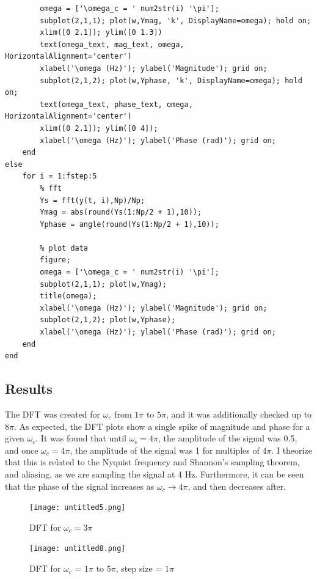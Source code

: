 \documentclass{article}
\begin{document}
\begin{enumerate}
\begin{lstlisting}[style=Matlab-editor]
        % plot data and text
        omega = ['\omega_c = ' num2str(i) '\pi'];
        subplot(2,1,1); plot(w,Ymag, 'k', DisplayName=omega); hold on;
        xlim([0 2.1]); ylim([0 1.3])
        text(omega_text, mag_text, omega, HorizontalAlignment='center')
        xlabel('\omega (Hz)'); ylabel('Magnitude'); grid on;
        subplot(2,1,2); plot(w,Yphase, 'k', DisplayName=omega); hold on;
        text(omega_text, phase_text, omega, HorizontalAlignment='center')
        xlim([0 2.1]); ylim([0 4]);
        xlabel('\omega (Hz)'); ylabel('Phase (rad)'); grid on;
    end
else
    for i = 1:fstep:5
        % fft
        Ys = fft(y(t, i),Np)/Np;
        Ymag = abs(round(Ys(1:Np/2 + 1),10));
        Yphase = angle(round(Ys(1:Np/2 + 1),10));
        
        % plot data
        figure;
        omega = ['\omega_c = ' num2str(i) '\pi'];
        subplot(2,1,1); plot(w,Ymag);
        title(omega);
        xlabel('\omega (Hz)'); ylabel('Magnitude'); grid on;
        subplot(2,1,2); plot(w,Yphase);
        xlabel('\omega (Hz)'); ylabel('Phase (rad)'); grid on;
    end
end
        \end{lstlisting}

\end{enumerate}


\subsection{Results}

The DFT was created for $\omega_c$ from $1\pi$ to $5\pi$, and it was additionally checked up to $8\pi$.  As expected, the DFT plots show a single spike of magnitude and phase for a given $\omega_c$. It was found that until $\omega_c = 4\pi$, the amplitude of the signal was 0.5, and once $\omega_c = 4\pi$, the amplitude of the signal was 1 for multiples of $4\pi$. I theorize that this is related to the Nyquist frequency and Shannon's sampling theorem, and aliasing, as we are sampling the signal at 4 Hz. Furthermore, it can be seen that the phase of the signal increases as $\omega_c \rightarrow 4\pi$, and then decreases after.

\begin{figure}[h]
    \centering
    \texttt{[image: untitled5.png]}
    \caption{DFT for $\omega_c = 3\pi$}
    \label{fig:enter-label}
\end{figure}

\begin{figure}[h]
    \centering
    \texttt{[image: untitled8.png]}
    \caption{DFT for $\omega_c$ = $1\pi$ to $5\pi$, step size = $1\pi$}
    \label{fig:enter-label}
\end{figure}
\end{document}
